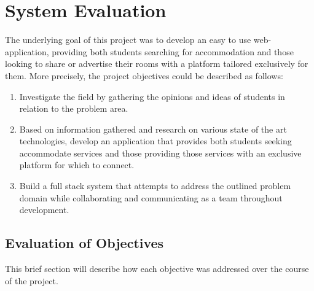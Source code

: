 \chapter{System Evaluation}
The underlying goal of this project was to develop an easy to use web-application, providing both students searching for accommodation and those looking to share or advertise their rooms with a platform tailored exclusively for them. More precisely, the project objectives could be described as follows: 

\begin{enumerate}
  \item Investigate the field by gathering the opinions and ideas of students in relation to the problem area.
  \item Based on information gathered and research on various state of the art technologies, develop an application that provides both students seeking accommodate services and those providing those services with an exclusive platform for which to connect.
  \item Build a full stack system that attempts to address the outlined problem domain while collaborating and communicating as a team throughout development.
\end{enumerate}

\section{Evaluation of Objectives}
This brief section will describe how each objective was addressed over the course of the project.

